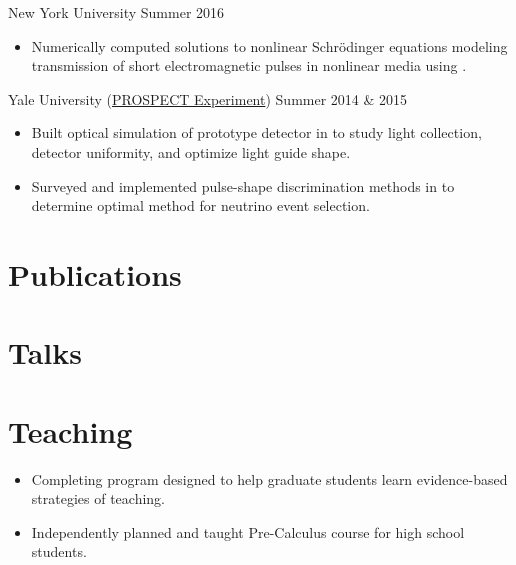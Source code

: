 \documentclass{cultvoucher}
\begin{document}
{New York University}
{Summer 2016}
\begin{itemize}
	\vspace{-0.25em}
	\item Numerically computed solutions to nonlinear Schr\"{o}dinger equations modeling transmission of short electromagnetic pulses in nonlinear media using .
\end{itemize}

{Yale University (\href{http://prospect.yale.edu/}{\small{PROSPECT Experiment}})}
{Summer 2014 \& 2015}
\begin{itemize}
	\vspace{-0.25em}
	\item Built optical simulation of prototype detector in  to study light collection, detector uniformity, and optimize light guide shape.
	\item Surveyed and implemented pulse-shape discrimination methods in  to determine optimal method for neutrino event selection.
\end{itemize}

\section{Publications}

\section{Talks}

\section{Teaching}

\begin{itemize}
	\vspace{-0.25em}
	\item Completing program designed to help graduate students learn evidence-based strategies of teaching.
\end{itemize}

\begin{itemize}
	\vspace{-0.25em}
	\item Independently planned and taught Pre-Calculus course for high school students.
\end{itemize}
\end{document}
